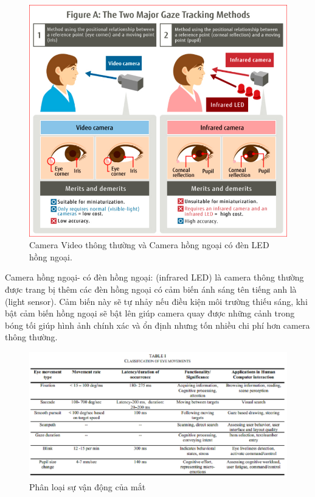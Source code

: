 \begin{center}
    \begin{figure}[h!]
    \begin{center}
     \includegraphics[scale=0.4]{img/Camera.png}
    \end{center}
    \caption{Camera Video thông thường và Camera hồng ngoại có đèn LED hồng ngoại. \cite{eyetrackingapplication}}
    \label{refhinh20}
    \end{figure}
\end{center}

Camera hồng ngoại- có đèn hồng ngoại:  (infrared LED) là camera thông thường được trang bị thêm  các đèn hồng ngoại  có cảm biến ánh sáng tên tiếng anh là (light sensor). Cảm biến này sẽ tự nhảy nếu điều kiện môi trường thiếu sáng, khi bật cảm biến hồng ngoại sẽ bật lên giúp camera quay được những cảnh trong bóng tối giúp hình ảnh chính xác và ổn định nhưng tốn nhiều chi phí hơn camera thông thường.


\begin{center}
    \begin{figure}[h!]
    \begin{center}
     \includegraphics[scale=0.5]{img/Classification_of_eye_movements.png}
    \end{center}
    \caption{Phân loại sự vận động của mắt \cite{AReviewandAnalysisofEyeGazeEstimation}}
    \label{refhinh15}
    \end{figure}
\end{center}

